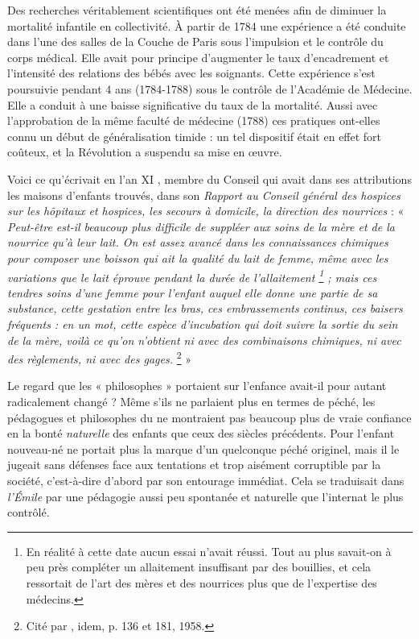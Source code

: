  Des recherches véritablement scientifiques ont été menées afin de diminuer la mortalité infantile en collectivité. À partir de 1784 une expérience a été conduite dans l'une des salles de la Couche de Paris sous l'impulsion et le contrôle du corps médical. Elle avait pour principe d'augmenter le taux d'encadrement et l'intensité des relations des bébés avec les soignants. Cette expérience s'est poursuivie pendant 4 ans (1784-1788) sous le contrôle de l'Académie de Médecine. Elle a conduit à une baisse significative du taux de la mortalité. Aussi avec l'approbation de la même faculté de médecine (1788) ces pratiques ont-elles connu un début de généralisation timide : un tel dispositif était en effet fort coûteux, et la Révolution a suspendu sa mise en œuvre.

 Voici ce qu'écrivait en l'an XI , membre du Conseil qui avait dans ses attributions les maisons d'enfants trouvés, dans son \emph{Rapport au Conseil général des hospices sur les hôpitaux et hospices, les secours à domicile, la direction des nourrices} : « \emph{Peut-être est-il beaucoup plus difficile de suppléer aux soins de la mère et de la nourrice qu'à leur lait. On est assez avancé dans les connaissances chimiques pour composer une boisson qui ait la qualité du lait de femme, même avec les variations que le lait éprouve pendant la durée de l'allaitement%
\footnote{En réalité à cette date aucun essai n'avait réussi. Tout au plus savait-on à peu près compléter un allaitement insuffisant par des bouillies, et cela ressortait de l'art des mères et des nourrices plus que de l'expertise des médecins.} 
; mais ces tendres soins d'une femme pour l'enfant auquel elle donne une partie de sa substance, cette gestation entre les bras, ces embrassements continus, ces baisers fréquents : en un mot, cette espèce d'incubation qui doit suivre la sortie du sein de la mère, voilà ce qu'on n'obtient ni avec des combinaisons chimiques, ni avec des règlements, ni avec des gages.}%
\footnote{Cité par , idem, p. 136 et 181, 1958.} »

Le regard que les « {philosophes} » portaient sur l'enfance avait-il pour autant radicalement changé ? Même s'ils ne parlaient plus en termes de péché, les pédagogues et philosophes du  ne montraient pas beaucoup plus de vraie confiance en la bonté \emph{naturelle} des enfants que ceux des siècles précédents. Pour  l'enfant nouveau-né ne portait plus la marque d'un quelconque péché originel, mais il le jugeait sans défenses face aux tentations et trop aisément corruptible par la société, c'est-à-dire d'abord par son entourage immédiat. Cela se traduisait dans \emph{l'Émile} par une pédagogie aussi peu spontanée et naturelle que l'internat le plus contrôlé. 
 
